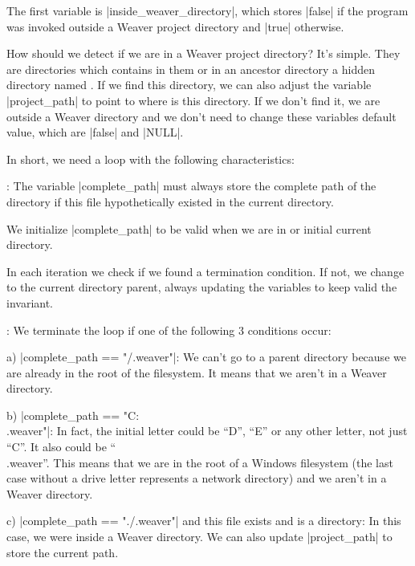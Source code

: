 {


The first variable is |inside_weaver_directory|, which stores |false|
if the program was invoked outside a Weaver project directory and
|true| otherwise.

How should we detect if we are in a Weaver project directory? It's
simple. They are directories which contains in them or in an ancestor
directory a hidden directory named . If we find
this directory, we can also adjust the variable |project_path| to
point to where is this directory. If we don't find it, we are outside
a Weaver directory and we don't need to change these variables default
value, which are |false| and |NULL|.

In short, we need a loop with the following characteristics:

: The variable |complete_path| must always store
the complete path of the directory  if this
file hypothetically existed in the current directory.

 We initialize |complete_path| to be valid
when we are in or initial current directory.

 In each iteration we check if we found a
termination condition. If not, we change to the current directory
parent, always updating the variables to keep valid the invariant.

: We terminate the loop if one of the following
3 conditions occur:

a) |complete_path == "/.weaver"|: We can't go to a parent directory
because we are already in the root of the filesystem. It means that we
aren't in a Weaver directory.

b) |complete_path == "C:\\.weaver"|: In fact, the initial letter could
be ``D'', ``E'' or any other letter, not just ``C''. It also could be
``\\.weaver''. This means that we are in the root of a Windows
filesystem (the last case without a drive letter represents a network
directory) and we aren't in a Weaver directory.

c) |complete_path == "./.weaver"| and this file exists and is a
directory: In this case, we were inside a Weaver directory. We can
also update |project_path| to store the current path.

}
